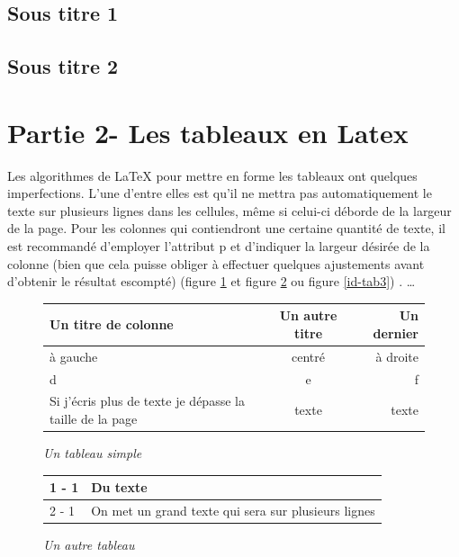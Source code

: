 \documentclass[11pt]{article}
\begin{document}
\subsection {Sous titre 1}
\subsection {Sous titre 2}
\section {Partie 2- Les tableaux en Latex}
Les algorithmes de LaTeX pour mettre en forme les tableaux ont quelques imperfections. L'une d'entre elles est qu'il ne mettra pas automatiquement le texte sur plusieurs lignes dans les cellules, même si celui-ci déborde de la largeur de la page. Pour les colonnes qui contiendront une certaine quantité de texte, il est recommandé d'employer l'attribut p et d'indiquer la largeur désirée de la colonne (bien que cela puisse obliger à effectuer quelques ajustements avant d'obtenir le résultat escompté) (figure \ref{id-tab1} et figure \ref{id-tab2} ou figure \ref{id-tab3})\cite{x3} \cite{x4}.
\ldots
\begin{figure}[!h]
\begin{center}
\begin{tabular}{|l|c|r|}
\hline Un titre de colonne & Un autre titre & Un dernier \\
\hline à gauche & centré & à droite \\
\hline d & e & f \\
\hline Si j'écris plus de texte je dépasse la taille de la page &  texte &  texte\\
\hline
\end{tabular}
\end{center}
\caption{\textit{Un tableau simple}}\label{id-tab1}
\end{figure}

\begin{figure}[!h]
\begin{center}
\begin{tabular}{|l|p{2.5cm}|} \hline
   1 - 1 & Du texte  \\      \hline
   2 - 1 & On met un grand texte qui sera sur plusieurs lignes \\ \hline
\end{tabular}
\end{center}
\caption{\textit{Un autre tableau}}\label{id-tab2}
\end{figure}
\end{document}
